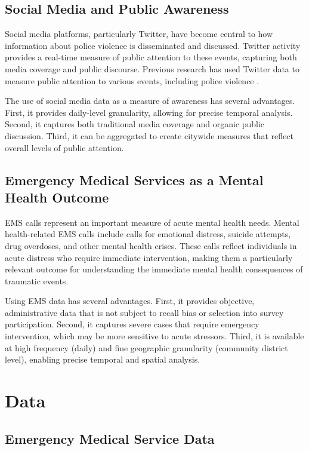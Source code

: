 \documentclass[11pt,a4paper]{article}
\begin{document}
\subsection{Social Media and Public Awareness}

Social media platforms, particularly Twitter, have become central to how information about police violence is disseminated and discussed. Twitter activity provides a real-time measure of public attention to these events, capturing both media coverage and public discourse. Previous research has used Twitter data to measure public attention to various events, including police violence \citep{freelon2016}.

The use of social media data as a measure of awareness has several advantages. First, it provides daily-level granularity, allowing for precise temporal analysis. Second, it captures both traditional media coverage and organic public discussion. Third, it can be aggregated to create citywide measures that reflect overall levels of public attention.

\subsection{Emergency Medical Services as a Mental Health Outcome}

EMS calls represent an important measure of acute mental health needs. Mental health-related EMS calls include calls for emotional distress, suicide attempts, drug overdoses, and other mental health crises. These calls reflect individuals in acute distress who require immediate intervention, making them a particularly relevant outcome for understanding the immediate mental health consequences of traumatic events.

Using EMS data has several advantages. First, it provides objective, administrative data that is not subject to recall bias or selection into survey participation. Second, it captures severe cases that require emergency intervention, which may be more sensitive to acute stressors. Third, it is available at high frequency (daily) and fine geographic granularity (community district level), enabling precise temporal and spatial analysis.

\section{Data}

\subsection{Emergency Medical Service Data}
\end{document}
